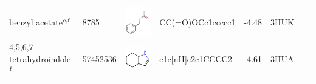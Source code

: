 \documentclass[aps,pre,twocolumn,nofootinbib,superscriptaddress,10pt, final,tightenlines]{revtex4-1}
\begin{document}
\begin{table}
\begin{center}
\begin{tabular}{llp{2cm}>{\ttfamily}lS[table-format=-1.2, table-figures-uncertainty=1]ll}
benzyl acetate$^{\rm e, f}$        & 8785                                 & \parbox[c]{1em}{\includegraphics[scale=0.2]{figures/8785.pdf}}     & CC(=O)OCc1ccccc1                     & -4.48                                            & 3HUK~\cite{boyce_predicting_2009} & \cite{boyce_predicting_2009}  \\ %
4,5,6,7-tetrahydroindole$^{\rm f}$ & 57452536                             & \parbox[c]{1em}{\includegraphics[scale=0.2]{figures/57452536.pdf}} & c1c[nH]c2c1CCCC2                     & -4.61                                            & 3HUA~\cite{boyce_predicting_2009} & \cite{boyce_predicting_2009}  \\ %

\end{tabular}
\end{center}
\end{table}
\end{document}
